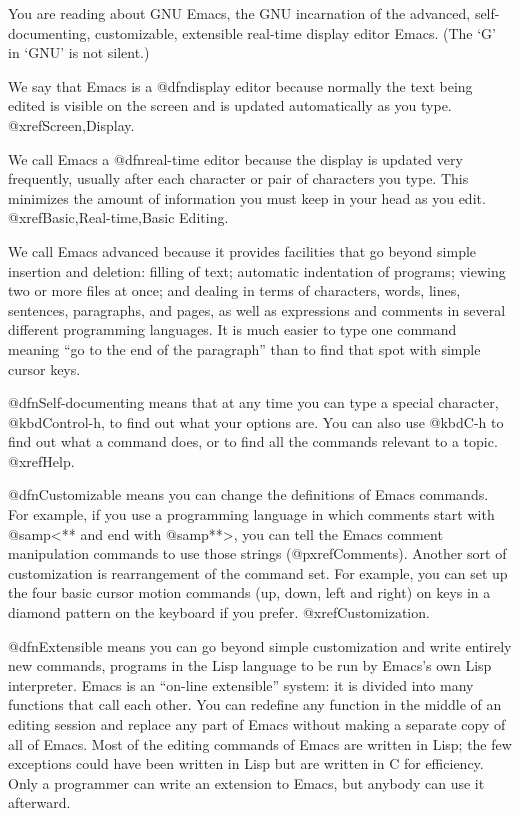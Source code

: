   You are reading about GNU Emacs, the GNU incarnation of the advanced,
self-documenting, customizable, extensible real-time display editor Emacs.
(The `G' in `GNU' is not silent.)

  We say that Emacs is a @dfn{display} editor because normally the text
being edited is visible on the screen and is updated automatically as you
type.  @xref{Screen,Display}.

  We call Emacs a @dfn{real-time} editor because the display is updated very
frequently, usually after each character or pair of characters you
type.  This minimizes the amount of information you must keep in your
head as you edit.  @xref{Basic,Real-time,Basic Editing}.

  We call Emacs advanced because it provides facilities that go beyond
simple insertion and deletion: filling of text; automatic indentation of
programs; viewing two or more files at once; and dealing in terms of
characters, words, lines, sentences, paragraphs, and pages, as well as
expressions and comments in several different programming languages.  It is
much easier to type one command meaning ``go to the end of the paragraph''
than to find that spot with simple cursor keys.

  @dfn{Self-documenting} means that at any time you can type a special
character, @kbd{Control-h}, to find out what your options are.  You can
also use @kbd{C-h} to find out what a command does, or to find all the
commands relevant to a topic.  @xref{Help}.

  @dfn{Customizable} means you can change the definitions of Emacs
commands.  For example, if you use a programming language in
which comments start with @samp{<**} and end with @samp{**>}, you can tell
the Emacs comment manipulation commands to use those strings
(@pxref{Comments}).  Another sort of customization is rearrangement of the
command set.  For example, you can set up the four basic cursor motion
commands (up, down, left and right) on keys in a diamond pattern on the
keyboard if you prefer.  @xref{Customization}.

  @dfn{Extensible} means you can go beyond simple customization and
write entirely new commands, programs in the Lisp language to be run by
Emacs's own Lisp interpreter.  Emacs is an ``on-line extensible''
system: it is divided into many functions that call each other.  You can
redefine any function in the middle of an editing session and replace
any part of Emacs without making a separate copy of all of Emacs.  Most
of the editing commands of Emacs are written in Lisp; the few
exceptions could have been written in Lisp but are written in C for
efficiency.  Only a programmer can write an extension to Emacs, but anybody
can use it afterward.

